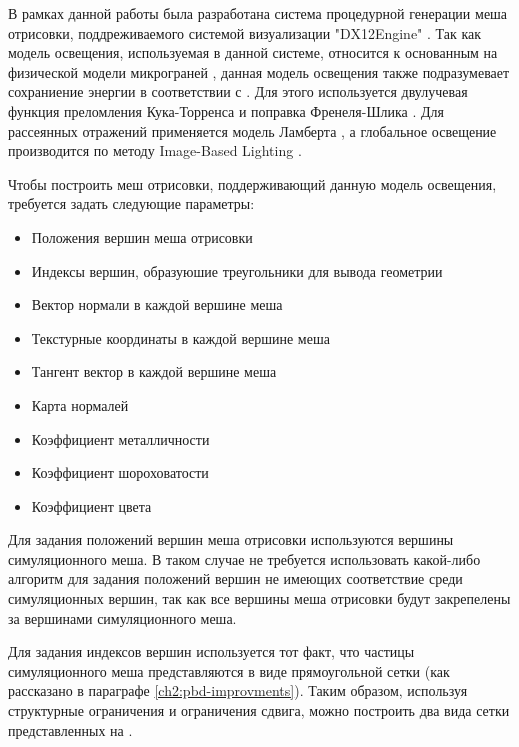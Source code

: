 	В рамках данной работы была разработана система процедурной генерации меша отрисовки, поддреживаемого системой визуализации "DX12Engine" \cite{me_bachelor}. Так как модель освещения, используемая в данной системе, относится к основанным на физической модели микрограней \cite{walter2007microfacet}, данная модель освещения также подразумевает сохраниение энергии в соответствии с  \cite{kajiya1986rendering}. Для этого используется двулучевая функция преломления Кука-Торренса \cite{cook1982reflectance} и поправка Френеля-Шлика \cite{schlick1994inexpensive}. Для рассеянных отражений применяется модель Ламберта \cite{ikeuchi2014lambertian}, а глобальное освещение производится по методу Image-Based Lighting \cite{debevec1998rendering}.
	
	Чтобы построить меш отрисовки, поддерживающий данную модель освещения, требуется задать следующие параметры:
	\begin{itemize}
		\item Положения вершин меша отрисовки
		\item Индексы вершин, образуюшие треугольники для вывода геометрии
		\item Вектор нормали в каждой вершине меша
		\item Текстурные координаты в каждой вершине меша
		\item Тангент вектор в каждой вершине меша
		\item Карта нормалей
		\item Коэффициент металличности
		\item Коэффициент шороховатости
		\item Коэффициент цвета
	\end{itemize}
	
	Для задания положений вершин меша отрисовки используются вершины симуляционного меша. В таком случае не требуется использовать какой-либо алгоритм для задания положений вершин не имеющих соответствие среди симуляционных вершин, так как все вершины меша отрисовки будут закрепелены за вершинами симуляционного меша.
	
	Для задания индексов вершин используется тот факт, что частицы симуляционного меша представляются в виде прямоугольной сетки (как рассказано в параграфе \ref{ch2:pbd-improvments}). Таким образом, используя структурные ограничения и ограничения сдвига, можно построить два вида сетки представленных на .
	
